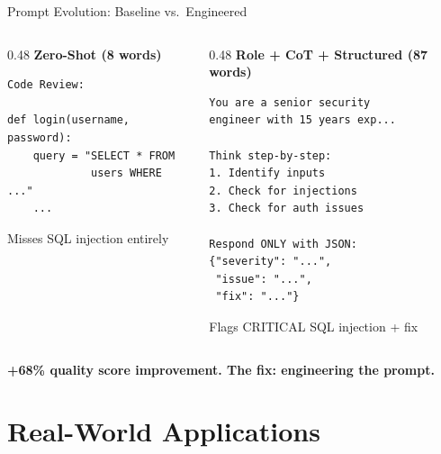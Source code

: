 \documentclass[aspectratio=169, 12pt]{beamer}
\begin{document}
\begin{frame}[fragile]{Prompt Evolution: Baseline vs.\ Engineered}
  \vspace{-0.3em}
  \begin{columns}[T]
    \begin{column}{0.48\textwidth}
      \textbf{Zero-Shot (8 words)}
\begin{lstlisting}
Code Review:

def login(username, password):
    query = "SELECT * FROM
             users WHERE ..."
    ...
\end{lstlisting}
      \textcolor{pfred}{\small Misses SQL injection entirely}
    \end{column}
    \begin{column}{0.48\textwidth}
      \textbf{Role + CoT + Structured (87 words)}
\begin{lstlisting}
You are a senior security
engineer with 15 years exp...

Think step-by-step:
1. Identify inputs
2. Check for injections
3. Check for auth issues

Respond ONLY with JSON:
{"severity": "...",
 "issue": "...",
 "fix": "..."}
\end{lstlisting}
      \textcolor{pfgreen}{\small Flags CRITICAL SQL injection + fix}
    \end{column}
  \end{columns}
  \vspace{0.4em}
  \begin{center}
    \textcolor{pfblue}{\textbf{+68\% quality score improvement. The fix: engineering the prompt.}}
  \end{center}
\end{frame}

\section{Real-World Applications}
\end{document}
